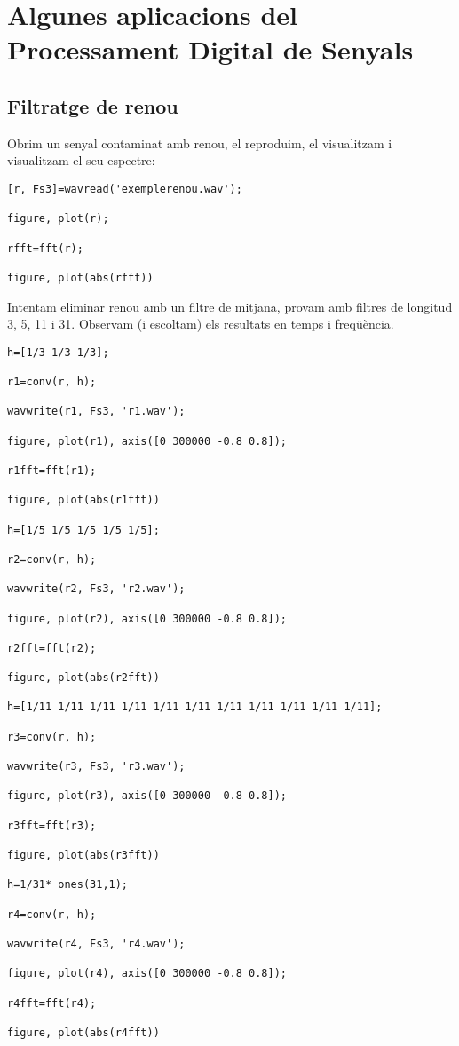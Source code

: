 \documentclass{article}
\begin{document}
\section{Algunes aplicacions del Processament Digital de Senyals}

\subsection{Filtratge de renou}

Obrim un senyal contaminat amb renou, el reproduim, el visualitzam i visualitzam el seu espectre:

\begin{verbatim}
[r, Fs3]=wavread('exemplerenou.wav');

figure, plot(r);

rfft=fft(r);

figure, plot(abs(rfft))
\end{verbatim}


Intentam eliminar renou amb un filtre de mitjana, provam amb filtres de longitud 3, 5, 11 i 31. Observam (i escoltam) els resultats en temps i freqüència.

\begin{verbatim}
h=[1/3 1/3 1/3];

r1=conv(r, h);

wavwrite(r1, Fs3, 'r1.wav');

figure, plot(r1), axis([0 300000 -0.8 0.8]);

r1fft=fft(r1);

figure, plot(abs(r1fft))

h=[1/5 1/5 1/5 1/5 1/5];

r2=conv(r, h);

wavwrite(r2, Fs3, 'r2.wav');

figure, plot(r2), axis([0 300000 -0.8 0.8]);

r2fft=fft(r2);

figure, plot(abs(r2fft))

h=[1/11 1/11 1/11 1/11 1/11 1/11 1/11 1/11 1/11 1/11 1/11];

r3=conv(r, h);

wavwrite(r3, Fs3, 'r3.wav');

figure, plot(r3), axis([0 300000 -0.8 0.8]);

r3fft=fft(r3);

figure, plot(abs(r3fft))

h=1/31* ones(31,1);

r4=conv(r, h);

wavwrite(r4, Fs3, 'r4.wav');

figure, plot(r4), axis([0 300000 -0.8 0.8]);

r4fft=fft(r4);

figure, plot(abs(r4fft))
\end{verbatim}
\end{document}
